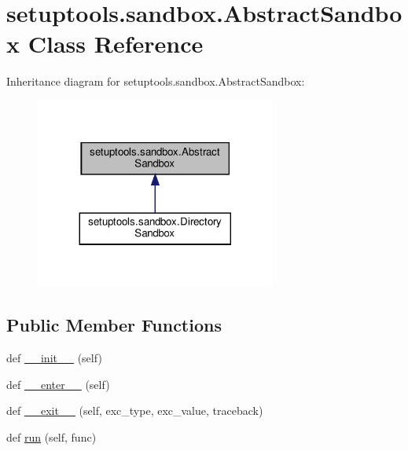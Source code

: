 \hypertarget{classsetuptools_1_1sandbox_1_1AbstractSandbox}{}\section{setuptools.\+sandbox.\+Abstract\+Sandbox Class Reference}
\label{classsetuptools_1_1sandbox_1_1AbstractSandbox}


Inheritance diagram for setuptools.\+sandbox.\+Abstract\+Sandbox\+:
\nopagebreak
\begin{figure}[H]
\begin{center}
\leavevmode
\includegraphics[width=224pt]{classsetuptools_1_1sandbox_1_1AbstractSandbox__inherit__graph}
\end{center}
\end{figure}
\subsection*{Public Member Functions}
\begin{DoxyCompactItemize}
\item 
def \hyperlink{classsetuptools_1_1sandbox_1_1AbstractSandbox_a283fc5635c6a4b806b444d36deb92c9b}{\+\_\+\+\_\+init\+\_\+\+\_\+} (self)
\item 
def \hyperlink{classsetuptools_1_1sandbox_1_1AbstractSandbox_a6fd06ba03e09745ee61151b4078c4dae}{\+\_\+\+\_\+enter\+\_\+\+\_\+} (self)
\item 
def \hyperlink{classsetuptools_1_1sandbox_1_1AbstractSandbox_adbfcba2aa94e7498b701864192f0576b}{\+\_\+\+\_\+exit\+\_\+\+\_\+} (self, exc\+\_\+type, exc\+\_\+value, traceback)
\item 
def \hyperlink{classsetuptools_1_1sandbox_1_1AbstractSandbox_a1a04bbba7a8e1a1afe0446d5b70c0dca}{run} (self, func)
\end{DoxyCompactItemize}


